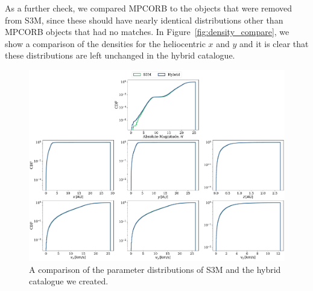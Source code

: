 \documentclass[twocolumn]{aastex631}
\newcommand{\sss}{S3M}
\newcommand{\mpco}{MPCORB}
\begin{document}
As a further check, we compared \mpco{} to the objects that were removed from \sss{}, since these should have nearly identical distributions other than MPCORB objects that had no matches. In Figure~\ref{fig:density_compare}, we show a comparison of the densities for the heliocentric $x$ and $y$ and it is clear that these distributions are left unchanged in the hybrid catalogue.
\begin{figure}[htb]
    \centering
    \includegraphics[width=\textwidth]{hybrid_vs_s3m_distributions.pdf}
    \caption{A comparison of the parameter distributions of \sss{} \citep{Grav+2011} and the hybrid catalogue we created.}
    \label{fig:hybrid_vs_s3m_dists}
\end{figure}
\end{document}
